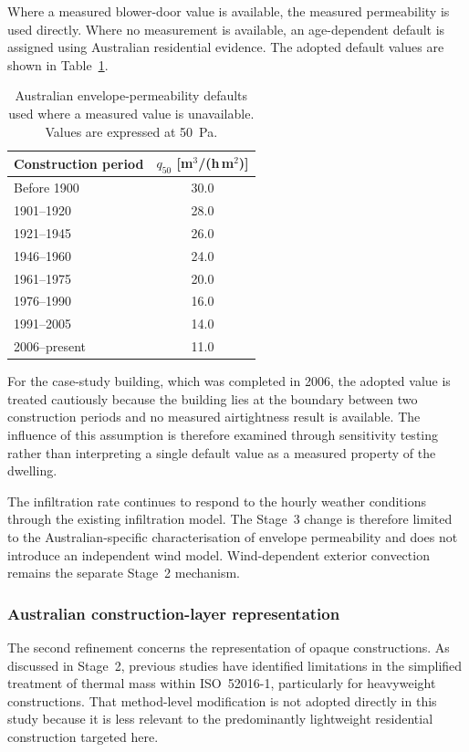 \documentclass[12pt, a4paper]{article}
\begin{document}
Where a measured blower-door value is available, the measured permeability is
used directly. Where no measurement is available, an age-dependent default is
assigned using Australian residential evidence. The adopted default values are
shown in Table~\ref{tab:AU_leakage}.

\begin{table}[htbp]
\centering
\caption{Australian envelope-permeability defaults used where a measured value
is unavailable. Values are expressed at 50~Pa.}
\label{tab:AU_leakage}
\begin{tabular}{lc}
\toprule
\textbf{Construction period} &
\textbf{$q_{50}$ [m$^3$/(h\,m$^2$)]} \\
\midrule
Before 1900    & 30.0 \\
1901--1920     & 28.0 \\
1921--1945     & 26.0 \\
1946--1960     & 24.0 \\
1961--1975     & 20.0 \\
1976--1990     & 16.0 \\
1991--2005     & 14.0 \\
2006--present  & 11.0 \\
\bottomrule
\end{tabular}
\end{table}

For the case-study building, which was completed in 2006, the adopted value is
treated cautiously because the building lies at the boundary between two
construction periods and no measured airtightness result is available.
The influence of this assumption is therefore examined through sensitivity
testing rather than interpreting a single default value as a measured property
of the dwelling.

The infiltration rate continues to respond to the hourly weather conditions
through the existing infiltration model. The Stage~3 change is therefore
limited to the Australian-specific characterisation of envelope permeability
and does not introduce an independent wind model. Wind-dependent exterior
convection remains the separate Stage~2 mechanism.

\subsubsection{Australian construction-layer representation}

The second refinement concerns the representation of opaque constructions.
As discussed in Stage~2, previous studies have identified limitations in the
simplified treatment of thermal mass within ISO~52016-1, particularly for
heavyweight constructions. That method-level modification is not adopted
directly in this study because it is less relevant to the predominantly
lightweight residential construction targeted here.
\end{document}
